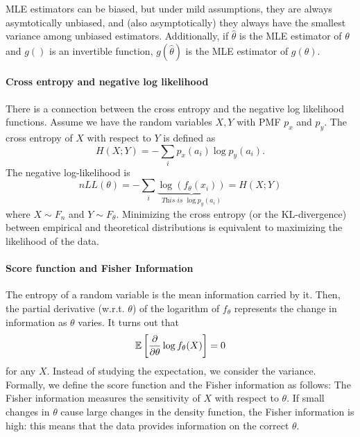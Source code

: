 MLE estimators can be biased, but under mild assumptions, they are always asymtotically unbiased, and (also asymptotically) they always have the smallest variance among unbiased estimators. Additionally, if $\hat{\theta}$ is the MLE estimator of $\theta$ and $g()$ is an invertible function, $g(\hat{\theta})$ is the MLE estimator of $g(\theta)$.

\paragraph{Cross entropy and negative log likelihood} There is a connection between the cross entropy and the negative log likelihood functions. Assume we have the random variables $X,Y$ with PMF $p_x$ and $p_y$. The cross entropy of $X$ with respect to $Y$ is defined as
\begin{equation*}
    H(X;Y) = - \sum_i p_x(a_i) \log p_y(a_i).
\end{equation*}   
The negative log-likelihood is
\begin{equation*}
    nLL(\theta) = - \sum_i \underset{\textit{This is } \log p_y(a_i)}{\underbrace{\log(f_{\theta}(x_i))}} = H(X;Y)
\end{equation*}   
where $X \sim F_n$ and $Y \sim F_{\theta}$. Minimizing the cross entropy (or the KL-divergence) between empirical and theoretical distributions is equivalent to maximizing the likelihood of the data.

\paragraph{Score function and Fisher Information}
The entropy of a random variable is the mean information carried by it. Then, the partial derivative (w.r.t. $\theta$) of the logarithm of $f_{\theta}$ represents the change in information as $\theta$ varies. It turns out that
\begin{equation*}
    \mathbb{E}\left[\frac{\partial}{\partial \theta} \log f_{\theta}(X)\right] = 0
\end{equation*}   
for any $X$. Instead of studying the expectation, we consider the variance. Formally, we define the score function and the Fisher information as follows:
The Fisher information measures the sensitivity of $X$ with respect to $\theta$. If small changes in $\theta$ cause large changes in the density function, the Fisher information is high: this means that the data provides information on the correct $\theta$.

